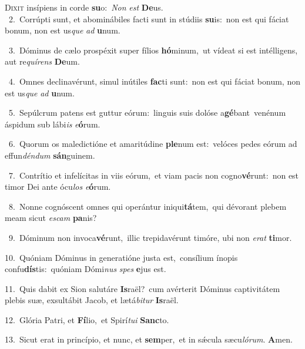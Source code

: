\lettrine{\initial\textcolor{\initialcolor}{D}}{ixit} insípiens in corde \textbf{su}\-o:~\star \textit{Non} \textit{est} \textbf{De}\-us.\\
{\numbfont\textcolor{\numbcolor}{~2.}}~Corrúpti sunt, et abominábiles facti sunt in stúdiis \textbf{su}\-is:~\star non est qui fáciat bonum, non est us\textit{que} \textit{ad} \textbf{u}\-num.\par
{\numbfont\textcolor{\numbcolor}{~3.}}~Dóminus de cælo prospéxit super fílios \textbf{hó}\-minum,~\star ut vídeat si est intélligens, aut re\-\textit{quí}\-\textit{rens} \textbf{De}\-um.\par
{\numbfont\textcolor{\numbcolor}{~4.}}~Omnes declinavérunt, simul inútiles \textbf{fac}\-ti sunt:~\star non est qui fáciat bonum, non est us\textit{que} \textit{ad} \textbf{u}\-num.\par
{\numbfont\textcolor{\numbcolor}{~5.}}~Sepúlcrum patens est guttur eórum:~\dagger linguis suis dolóse a\-\textbf{gé}\-bant~\star venénum áspidum sub lábi\textit{is} \textit{e}\-\textbf{ó}rum.\par
{\numbfont\textcolor{\numbcolor}{~6.}}~Quorum os maledictióne et amaritúdine \textbf{ple}\-num est:~\star velóces pedes eórum ad effun\-\textit{dén}\-\textit{dum} \textbf{sán}\-guinem.\par
{\numbfont\textcolor{\numbcolor}{~7.}}~Contrítio et infelícitas in viis eórum,~\dagger et viam pacis non cogno\-\textbf{vé}\-runt:~\star non est timor Dei ante ócu\textit{los} \textit{e}\-\textbf{ó}rum.\par
{\numbfont\textcolor{\numbcolor}{~8.}}~Nonne cognóscent omnes qui operántur iniqui\-\textbf{tá}\-tem,~\star qui dévorant plebem meam sicut \textit{es}\-\textit{cam} \textbf{pa}\-nis?\par
{\numbfont\textcolor{\numbcolor}{~9.}}~Dóminum non invoca\-\textbf{vé}\-runt,~\star illic trepidavérunt timóre, ubi non \textit{e}\-\textit{rat} \textbf{ti}\-mor.\par
{\numbfont\textcolor{\numbcolor}{10.}}~Quóniam Dóminus in generatióne justa est,~\dagger consílium ínopis confu\-\textbf{dís}\-tis:~\star quóniam Dómi\textit{nus} \textit{spes} \textbf{e}\-jus est.\par
{\numbfont\textcolor{\numbcolor}{11.}}~Quis dabit ex Sion salutáre \textbf{Is}\-raël?~\star cum avérterit Dóminus captivitátem plebis suæ, exsultábit Jacob, et lætá\-\textit{bi}\-\textit{tur} \textbf{Is}\-raël.\par
{\numbfont\textcolor{\numbcolor}{12.}}~Glória Patri, et \textbf{Fí}\-lio,~\star et Spirí\-\textit{tu}\-\textit{i} \textbf{Sanc}\-to.\par
{\numbfont\textcolor{\numbcolor}{13.}}~Sicut erat in princípio, et nunc, et \textbf{sem}\-per,~\star et in sǽcula sæcu\-\textit{ló}\-\textit{rum}. \textbf{A}\-men.\par
